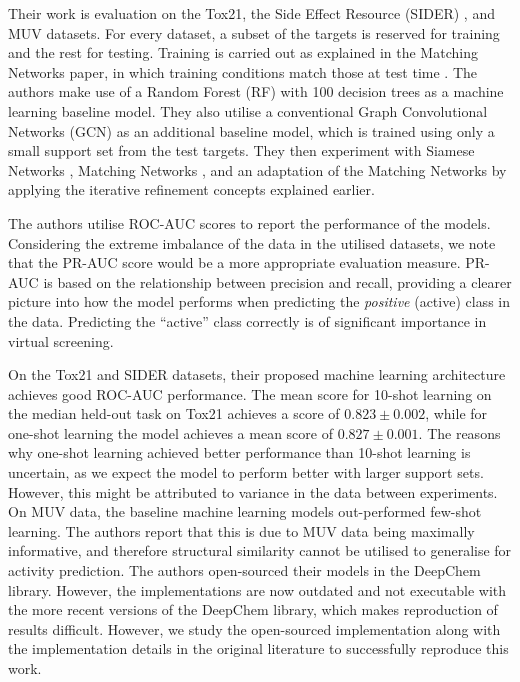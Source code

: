 Their work is evaluation on the Tox21, the Side Effect Resource (SIDER) \citep{kuhn2016sider}, and MUV datasets\citep{rohrer2009maximum}. For every dataset, a subset of the targets is reserved for training and the rest for testing. Training is carried out as explained in the Matching Networks paper, in which training conditions match those at test time \citep{vinyals2016matching}. The authors make use of a Random Forest (RF) with 100 decision trees as a machine learning baseline model. They also utilise a conventional Graph Convolutional Networks (GCN)\citep{kipf2016semi} as an additional baseline model, which is trained using only a small support set from the test targets. They then experiment with Siamese Networks \citep{koch2015siamese}, Matching Networks \citep{vinyals2016matching}, and an adaptation of the Matching Networks by applying the iterative refinement concepts explained earlier.

The authors utilise ROC-AUC scores to report the performance of the models. Considering the extreme imbalance of the data in the utilised datasets, we note that the PR-AUC score would be a more appropriate evaluation measure. PR-AUC is based on the relationship between precision and recall, providing a clearer picture into how the model performs when predicting the \textit{positive} (active) class in the data. Predicting the ``active'' class correctly is of significant importance in virtual screening.

On the Tox21 and SIDER datasets, their proposed machine learning architecture achieves good ROC-AUC performance. The mean score for 10-shot learning on the median held-out task on Tox21 achieves a score of $0.823 \pm 0.002$, while for one-shot learning the model achieves a mean score of $0.827 \pm 0.001$. The reasons why one-shot learning achieved better performance than 10-shot learning is uncertain, as we expect the model to perform better with larger support sets. However, this might be attributed to variance in the data between experiments. On MUV data, the baseline machine learning models out-performed few-shot learning. The authors report that this is due to MUV data being maximally informative, and therefore structural similarity cannot be utilised to generalise for activity prediction. The authors open-sourced their models in the DeepChem library\citep{ramsundar2019deep}. However, the implementations are now outdated and not executable with the more recent versions of the DeepChem library, which makes reproduction of results difficult. However, we study the open-sourced implementation along with the implementation details in the original literature to successfully reproduce this work.
